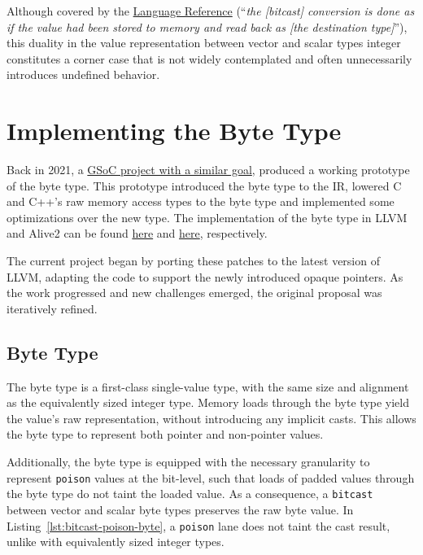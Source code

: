 \documentclass[a4paper,12pt]{article}
\begin{document}
Although covered by the \href{https://llvm.org/docs/LangRef.html#bitcast-to-instruction}{Language Reference} (``\textit{the [bitcast] conversion is done as if the value had been stored to memory and read back as [the destination type]}''), this duality in the value representation between vector and scalar types integer constitutes a corner case that is not widely contemplated and often unnecessarily introduces undefined behavior.

\section{Implementing the Byte Type}

Back in 2021, a \href{https://github.com/georgemitenkov/GSoC-2021}{GSoC project with a similar goal}, produced a working prototype of the byte type.
This prototype introduced the byte type to the IR, lowered C and C++'s raw memory access types to the byte type and implemented some optimizations over the new type.
The implementation of the byte type in LLVM and Alive2 can be found \href{https://github.com/pedroclobo/llvm-project/tree/byte-type}{here} and \href{https://github.com/pedroclobo/alive2/tree/byte-type}{here}, respectively.

The current project began by porting these patches to the latest version of LLVM, adapting the code to support the newly introduced opaque pointers.
As the work progressed and new challenges emerged, the original proposal was iteratively refined.

\subsection{Byte Type}

The byte type is a first-class single-value type, with the same size and alignment as the equivalently sized integer type.
Memory loads through the byte type yield the value's raw representation, without introducing any implicit casts.
This allows the byte type to represent both pointer and non-pointer values.

Additionally, the byte type is equipped with the necessary granularity to represent \texttt{poison} values at the bit-level, such that loads of padded values through the byte type do not taint the loaded value.
As a consequence, a \texttt{bitcast} between vector and scalar byte types preserves the raw byte value.
In Listing~\ref{lst:bitcast-poison-byte}, a \texttt{poison} lane does not taint the cast result, unlike with equivalently sized integer types.
\end{document}
